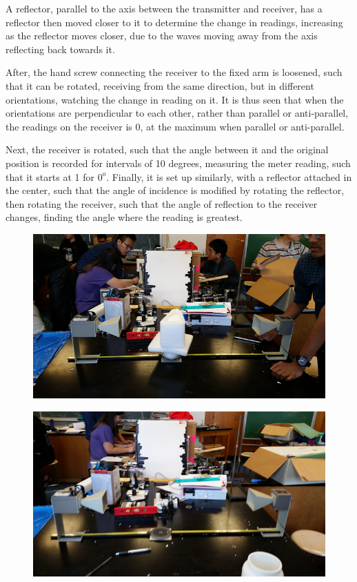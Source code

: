 \documentclass[11pt, titlepage]{article}
\begin{document}
A reflector, parallel to the axis between the transmitter and receiver, has a reflector then moved closer to it to determine the change in readings, increasing as the reflector moves closer, due to the waves moving away from the axis reflecting back towards it.

After, the hand screw connecting the receiver to the fixed arm is loosened, such that it can be rotated, receiving from the same direction, but in different orientations, watching the change in reading on it. It is thus seen that when the orientations are perpendicular to each other, rather than parallel or anti-parallel, the readings on the receiver is 0, at the maximum when parallel or anti-parallel.

Next, the receiver is rotated, such that the angle between it and the original position is recorded for intervals of 10 degrees, measuring the meter reading, such that it starts at 1 for $0^o$. Finally, it is set up similarly, with a reflector attached in the center, such that the angle of incidence is modified by rotating the reflector, then rotating the receiver, such that the angle of reflection to the receiver changes, finding the angle where the reading is greatest.

\begin{figure}[h]
\centering
\hspace*{0cm}
\includegraphics[scale=1]{lab71.jpg}
\vspace*{0cm}
\end{figure}

\begin{figure}[h]
\centering
\hspace*{0cm}
\includegraphics[scale=1]{lab72.jpg}
\vspace*{0cm}
\end{figure}
\end{document}
